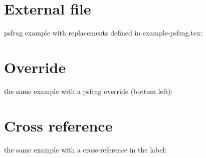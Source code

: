 \documentclass{article}
\begin{document}
\section{External file}
psfrag example with replacements defined in example-psfrag.tex:\par
{}

\section{Override}
the same example with a psfrag override (bottom left):\par
{}

\section{Cross reference}\label{sec:cross}
the same example with a cross-reference in the label:\par
{}
\end{document}
